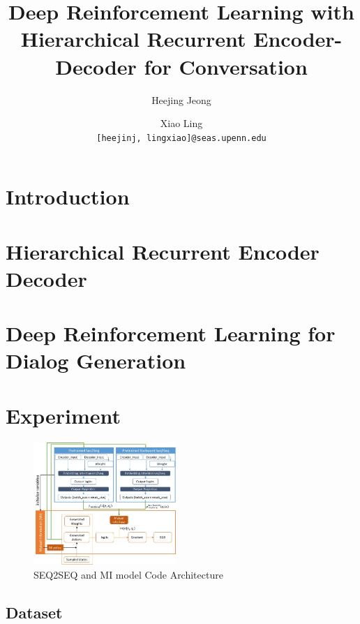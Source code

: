\documentclass[letterpaper]{article}
\begin{document}
%
\title{Deep Reinforcement Learning with Hierarchical Recurrent Encoder-Decoder for Conversation }
\author{Heejing Jeong \and Xiao Ling\\
  {\tt [heejinj, lingxiao]@seas.upenn.edu}}
\maketitle

\section{Introduction}


\section{Hierarchical Recurrent Encoder Decoder}


\section{Deep Reinforcement Learning for Dialog Generation}


\section{Experiment}

\begin{figure}[bt!]
    \centering
    \includegraphics[width=0.48\textwidth]{mi_architecture} 
    \caption{\small SEQ2SEQ and MI model Code Architecture}
    \label{fig:mi_architecture}
 \end{figure}

\subsection{Dataset}

\end{document}
